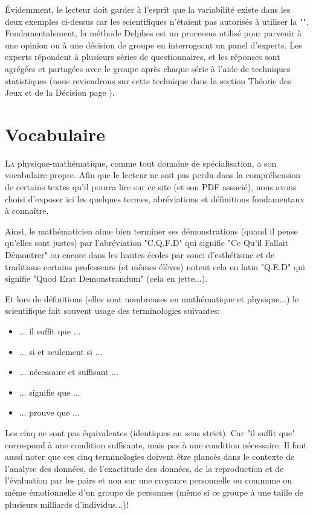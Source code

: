 	Évidemment, le lecteur doit garder à l'esprit que la variabilité existe dans les deux exemples ci-dessus car les scientifiques n'étaient pas autorisés à utiliser la "". Fondamentalement, la méthode Delphes est un processus utilisé pour parvenir à une opinion ou à une décision de groupe en interrogeant un panel d'experts. Les experts répondent à plusieurs séries de questionnaires, et les réponses sont agrégées et partagées avec le groupe après chaque série à l'aide de techniques statistiques (nous reviendrons sur cette technique dans la section Théorie des Jeux et de la Décision page \pageref{Delphi method}).
	
	\newpage
	\thispagestyle{empty}
	\mbox{}
	\section{Vocabulaire}
	\lettrine[lines=4]{\color{BrickRed}L}a physique-math\'ematique, comme tout domaine de sp\'ecialisation, a son vocabulaire propre. Afin que le lecteur ne soit pas perdu dans la compr\'ehension de certains textes qu'il pourra lire sur ce site (et son PDF associ\'e), nous avons choisi d'exposer ici les quelques termes, abr\'eviations et d\'efinitions fondamentaux à connaître. 

	Ainsi, le math\'ematicien aime bien terminer ses d\'emonstrations (quand il pense qu'elles sont justes) par l'abr\'eviation "C.Q.F.D" qui signifie "Ce Qu'il Fallait D\'emontrer" ou encore dans les hautes \'ecoles par souci d'esth\'etisme et de traditions certains professeurs (et mêmes \'elèves) notent cela en latin "Q.E.D" qui signifie "Quod Erat Demonstrandum" (cela en jette...).

	Et lors de d\'efinitions (elles sont nombreuses en math\'ematique et physique...) le scientifique fait souvent usage des terminologies suivantes:
	
	\begin{itemize}
	\item ... il suffit que  ...
	
	\item ... si et seulement si ...
	
	\item ... n\'ecessaire et suffisant ...
	
	\item ... signifie que ...
	
	\item ... prouve que ...
	\end{itemize}
	Les cinq ne sont pas \'equivalentes (identiques au sens strict). Car "il suffit que" correspond à une condition suffisante, mais pas à une condition n\'ecessaire. Il faut aussi noter que ces cinq terminologies doivent être planc\'es dans le contexte de l'analyse des donn\'ees, de l'exactitude des donn\'ees, de la reproduction et de l'\'evaluation par les pairs et non sur une croyance personnelle ou commune ou même \'emotionnelle d'un groupe de personnes (même si ce groupe à une taille de plusieurs milliards d'individus...)!
	
